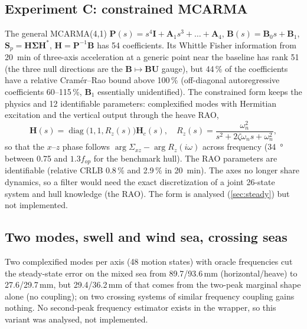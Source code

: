 \documentclass[conference]{IEEEtran}
\DeclareRobustCommand{\mat}[1]{\bm{#1}}
\theoremstyle{bodysmall}
\begin{document}
\subsection{Experiment C: constrained MCARMA}
The general MCARMA(4,1) $\mat P(s)=s^4\mat I+\mat A_1s^3+\dots+\mat A_4$,
$\mat B(s)=\mat B_0s+\mat B_1$, $\mat S_p=\mat H\mat\Sigma\mat H^*$,
$\mat H=\mat P^{-1}\mat B$ \cite{marquardt07,schlemm12,stelzer24} has 54
coefficients. Its Whittle Fisher information \cite{whittle53,fasen22} from
\SI{20}{min} of three-axis acceleration at a generic point near the baseline
has rank 51 (the three null directions are the $\mat B\mapsto\mat B\mat U$
gauge), but 44\,\% of the coefficients have a relative Cram\'er--Rao bound
above 100\,\% (off-diagonal autoregressive coefficients 60--115\,\%,
$\mat B_1$ essentially unidentified). The constrained form keeps
the physics and 12 identifiable parameters: complexified modes with Hermitian
excitation and the vertical output through the heave RAO,
\begin{equation}
\mat H(s)=\operatorname{diag}\bigl(1,1,R_z(s)\bigr)\mat H_c(s),\quad
R_z(s)=\frac{\omega_n^2}{s^2+2\zeta\omega_ns+\omega_n^2},
\end{equation}
so that the $x$--$z$ phase follows $\arg\Sigma_{xz}-\arg R_z(i\omega)$
across frequency (\SI{34}{\degree} between 0.75 and $1.3f_{op}$ for the
benchmark hull). The RAO parameters are identifiable (relative CRLB
0.8\,\% and 2.9\,\% in \SI{20}{min}). The axes no longer share dynamics, so a
filter would need the exact discretization of a joint 26-state system and
hull knowledge (the RAO). The form is analysed (\cref{sec:steady}) but not
implemented.

\subsection{Two modes, swell and wind sea, crossing seas}
Two complexified modes per axis (48 motion states) with oracle frequencies
cut the steady-state error on the mixed sea from 89.7/93.6\,mm
(horizontal/heave) to 27.6/29.7\,mm, but 29.4/36.2\,mm of that comes from
the two-peak marginal shape alone (no coupling); on two crossing systems of
similar frequency coupling gains nothing. No second-peak frequency
estimator exists in the wrapper, so this variant was analysed, not
implemented.
\end{document}
